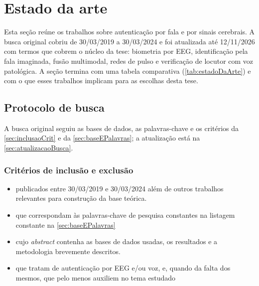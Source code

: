 	\section{Estado da arte}
		\label{sec:trabalhosMaisRecentes}

		\par Esta seção reúne os trabalhos sobre autenticação por fala e por sinais cerebrais. A busca original cobriu de 30/03/2019 a 30/03/2024 e foi atualizada até 12/11/2026 com termos que cobrem o núcleo da tese: biometria por \ac{EEG}, identificação pela fala imaginada, fusão multimodal, redes de pulso e verificação de locutor com voz patológica. A seção termina com uma tabela comparativa (\autoref{tab:estadoDaArte}) e com o que esses trabalhos implicam para as escolhas desta tese.

		\subsection{Protocolo de busca}

			\par A busca original seguiu as bases de dados, as palavras-chave e os critérios da \autoref{sec:inclusaoCrit} e da \autoref{sec:baseEPalavras}; a atualização está na \autoref{sec:atualizacaoBusca}.

			\subsubsection{Critérios de inclusão e exclusão}
			\label{sec:inclusaoCrit}
			\begin{itemize}
				\item publicados entre 30/03/2019 e 30/03/2024 além de outros trabalhos relevantes para construção da base teórica.
				\item que correspondam às palavras-chave de pesquisa constantes na listagem constante na \autoref{sec:baseEPalavras}
				\item cujo \textit{abstract} contenha as bases de dados usadas, os resultados e a metodologia brevemente descritos.
				\item que tratam de autenticação por EEG e/ou voz, e, quando da falta dos mesmos, que pelo menos auxiliem no tema estudado
			\end{itemize}
			
			
